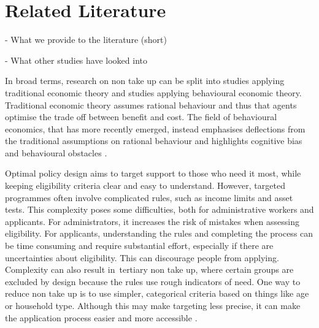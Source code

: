\section{Related Literature} \label{sec:literature}

- What we provide to the literature (short) 

- What other studies have looked into

In broad terms, research on non take up can be split into studies applying traditional economic theory and studies applying behavioural economic theory. Traditional economic theory assumes rational behaviour and thus that agents optimise the trade off between benefit and cost. The field of behavioural economics, that has more recently emerged, instead emphasises deflections from the traditional assumptions on rational behaviour and highlights cognitive bias and behavioural obstacles \citep{mechelen_who_2017}.

Optimal policy design aims to target support to those who need it most, while keeping eligibility criteria clear and easy to understand. However, targeted programmes often involve complicated rules, such as income limits and asset tests. This complexity poses some difficulties, both for administrative workers and applicants. For administrators, it increases the risk of mistakes when assessing eligibility. For applicants, understanding the rules and completing the process can be time consuming and require substantial effort, especially if there are uncertainties about eligibility. This can discourage people from applying. Complexity can also result in tertiary non take up, where certain groups are excluded by design because the rules use rough indicators of need. One way to reduce non take up is to use simpler, categorical criteria based on things like age or household type. Although this may make targeting less precise, it can make the application process easier and more accessible \citep{mechelen_who_2017}.